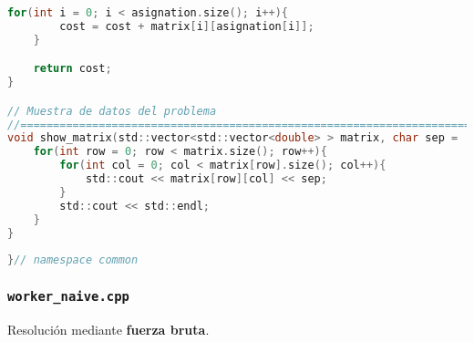 \documentclass[10pt, a4paper]{article}
\theoremstyle{theorem-style}
\theoremstyle{theorem-style}
\theoremstyle{definition-style}
\theoremstyle{remark-style}
\theoremstyle{example-style}
\theoremstyle{definition-style}
\theoremstyle{remark-style}
\begin{document}
\begin{lstlisting}[language=C]
    for(int i = 0; i < asignation.size(); i++){
        cost = cost + matrix[i][asignation[i]];
    }

    return cost;
}

// Muestra de datos del problema
//==============================================================================
void show_matrix(std::vector<std::vector<double> > matrix, char sep = '\t'){
    for(int row = 0; row < matrix.size(); row++){
        for(int col = 0; col < matrix[row].size(); col++){
            std::cout << matrix[row][col] << sep;
        }
        std::cout << std::endl;
    }
}
    
}// namespace common
\end{lstlisting}

\subsubsection*{\texttt{worker\_naive.cpp}}

Resolución mediante \textbf{fuerza bruta}.
\end{document}
